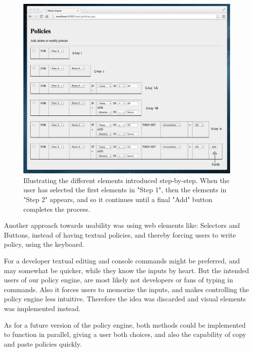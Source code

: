 \begin{figure}[h!]
\centering
\includegraphics[width=\columnwidth]{building_policy_steps.png}
\caption{Illustrating the different elements introduced step-by-step. When the user has selected the first elements in "Step 1", then the elements in "Step 2" appears, and so it continues until a final "Add" button completes the process.}
\label{fig:building_policy_steps}
\end{figure}

Another approach towards usability was using web elements like: Selectors and Buttons, instead of having textual policies, and thereby forcing users to write policy, using the keyboard.

For a developer textual editing and console commands might be preferred, and may somewhat be quicker, while they know the inputs by heart. But the intended users of our policy engine, are most likely not developers or fans of typing in commands.
Also it forces users to memorize the inputs, and makes controlling the policy engine less intuitive. Therefore the idea was discarded and visual elements was implemented instead.

As for a future version of the policy engine, both methods could be implemented to function in parallel, giving a user both choices, and also the capability of copy and paste policies quickly.
